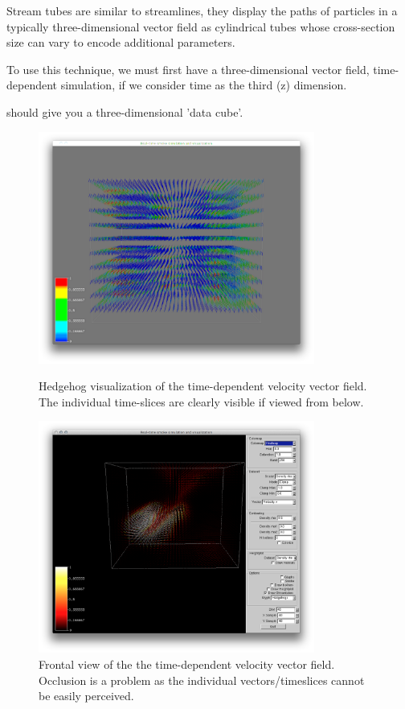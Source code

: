 
 Stream tubes are similar to streamlines, they display the paths of particles in a typically three-dimensional vector field as cylindrical tubes whose cross-section size can vary to encode additional parameters.
 
 To use this technique, we must first have a three-dimensional vector field,
 time-dependent simulation, if we consider time as the third (z) dimension. 
 
 should give you a three-dimensional 'data cube'. 
 
 \begin{figure}[htbp]
 \centering
 \begin{minipage}[t]{0.48\textwidth}
 \includegraphics[height=3in]{figures/streamtubes/30datacube_bottom.png}
 \caption{Hedgehog visualization of the time-dependent velocity vector field. The individual time-slices are clearly visible if viewed from below.}
 \label{fig:datacube_bottom}
 \end{minipage}\hspace{.04\textwidth}%
 \begin{minipage}[t]{0.48\textwidth}
 \includegraphics[height=3in]{figures/streamtubes/31datacube_front.png}
 \caption{Frontal view of the the time-dependent velocity vector field. Occlusion is a problem as the individual vectors/timeslices cannot be easily perceived.}
 \label{fig:}
 \end{minipage}
 \end{figure}
 
